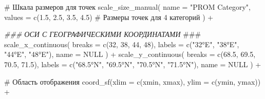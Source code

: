 \documentclass[
  letterpaper,
  DIV=11,
  numbers=noendperiod]{scrreprt}
\newenvironment{Shaded}{\begin{snugshade}}{\end{snugshade}}
\newcommand{\AlertTok}[1]{\textcolor[rgb]{0.68,0.00,0.00}{#1}}
\newcommand{\AttributeTok}[1]{\textcolor[rgb]{0.40,0.45,0.13}{#1}}
\newcommand{\CommentTok}[1]{\textcolor[rgb]{0.37,0.37,0.37}{#1}}
\newcommand{\ConstantTok}[1]{\textcolor[rgb]{0.56,0.35,0.01}{#1}}
\newcommand{\DecValTok}[1]{\textcolor[rgb]{0.68,0.00,0.00}{#1}}
\newcommand{\DocumentationTok}[1]{\textcolor[rgb]{0.37,0.37,0.37}{\textit{#1}}}
\newcommand{\FloatTok}[1]{\textcolor[rgb]{0.68,0.00,0.00}{#1}}
\newcommand{\FunctionTok}[1]{\textcolor[rgb]{0.28,0.35,0.67}{#1}}
\newcommand{\NormalTok}[1]{\textcolor[rgb]{0.00,0.23,0.31}{#1}}
\newcommand{\SpecialCharTok}[1]{\textcolor[rgb]{0.37,0.37,0.37}{#1}}
\newcommand{\StringTok}[1]{\textcolor[rgb]{0.13,0.47,0.30}{#1}}
\begin{document}
\begin{Shaded}
\begin{Highlighting}[]
  \CommentTok{\# Шкала размеров для точек}
  \FunctionTok{scale\_size\_manual}\NormalTok{(}
    \AttributeTok{name =} \StringTok{"PROM Category"}\NormalTok{,}
    \AttributeTok{values =} \FunctionTok{c}\NormalTok{(}\FloatTok{1.5}\NormalTok{, }\FloatTok{2.5}\NormalTok{, }\FloatTok{3.5}\NormalTok{, }\FloatTok{4.5}\NormalTok{)  }\CommentTok{\# Размеры точек для 4 категорий}
\NormalTok{  ) }\SpecialCharTok{+}
  
  \DocumentationTok{\#\#\# ОСИ С ГЕОГРАФИЧЕСКИМИ КООРДИНАТАМИ }\AlertTok{\#\#\#}
  \FunctionTok{scale\_x\_continuous}\NormalTok{(}
    \AttributeTok{breaks =} \FunctionTok{c}\NormalTok{(}\DecValTok{32}\NormalTok{, }\DecValTok{38}\NormalTok{, }\DecValTok{44}\NormalTok{, }\DecValTok{48}\NormalTok{),                    }
    \AttributeTok{labels =} \FunctionTok{c}\NormalTok{(}\StringTok{"32°E"}\NormalTok{, }\StringTok{"38°E"}\NormalTok{, }\StringTok{"44°E"}\NormalTok{, }\StringTok{"48°E"}\NormalTok{),    }
    \AttributeTok{name =} \ConstantTok{NULL}
\NormalTok{  ) }\SpecialCharTok{+}
  \FunctionTok{scale\_y\_continuous}\NormalTok{(}
    \AttributeTok{breaks =} \FunctionTok{c}\NormalTok{(}\FloatTok{68.5}\NormalTok{, }\FloatTok{69.5}\NormalTok{, }\FloatTok{70.5}\NormalTok{, }\FloatTok{71.5}\NormalTok{),          }
    \AttributeTok{labels =} \FunctionTok{c}\NormalTok{(}\StringTok{"68.5°N"}\NormalTok{, }\StringTok{"69.5°N"}\NormalTok{, }\StringTok{"70.5°N"}\NormalTok{, }\StringTok{"71.5°N"}\NormalTok{),}
    \AttributeTok{name =} \ConstantTok{NULL}
\NormalTok{  ) }\SpecialCharTok{+}
  
  \CommentTok{\# Область отображения}
  \FunctionTok{coord\_sf}\NormalTok{(}\AttributeTok{xlim =} \FunctionTok{c}\NormalTok{(xmin, xmax), }\AttributeTok{ylim =} \FunctionTok{c}\NormalTok{(ymin, ymax)) }\SpecialCharTok{+}
  

\end{Highlighting}
\end{Shaded}
\end{document}
